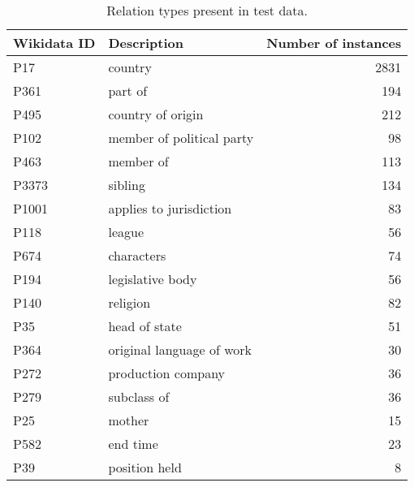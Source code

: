 \documentclass[11pt]{article}
\begin{document}
\begin{table*}
\centering
\begin{tabular}{llr}
\hline
Wikidata ID & Description & Number of instances\\
\hline
P17 & country & 2831\\
P361 & part of & 194\\
P495 & country of origin & 212\\
P102 & member of political party & 98\\
P463 & member of & 113\\
P3373 & sibling & 134\\
P1001 & applies to jurisdiction & 83\\
P118 & league & 56\\
P674 & characters & 74\\
P194 & legislative body & 56\\
P140 & religion & 82\\
P35 & head of state & 51\\
P364 & original language of work & 30\\
P272 & production company & 36\\
P279 & subclass of & 36\\
P25 & mother & 15\\
P582 & end time & 23\\
P39 & position held & 8\\
\hline
\end{tabular}
\caption{\label{tab:test-types} Relation types present in test data.}
\end{table*}
\end{document}
